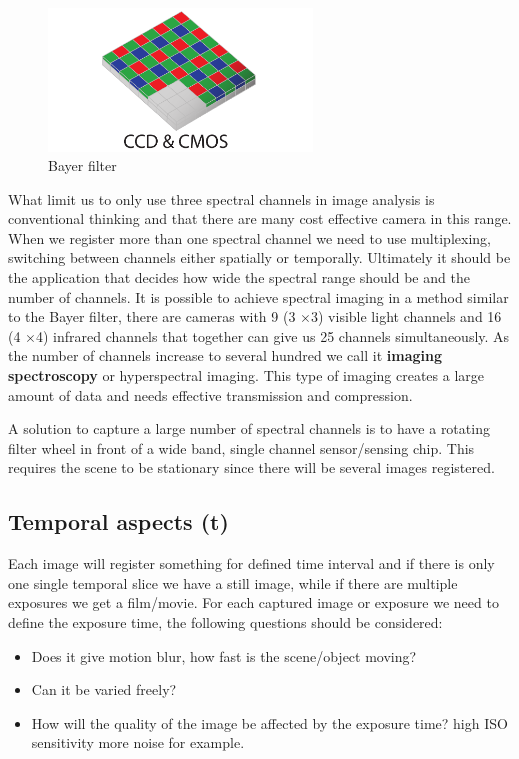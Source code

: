 \begin{figure}[ht!]
\centering
\includegraphics[width=70mm]{figures/CCDandCMOS.pdf}
\caption{Bayer filter}
\label{fig:example}
\end{figure}

What limit us to only use three spectral channels in image analysis is conventional thinking and that there are many cost effective camera in this range. When we register more than one spectral channel we need to use multiplexing, switching between channels either spatially or temporally. Ultimately it should be the application that decides how wide the spectral range should be and the number of channels. It is possible to achieve spectral imaging in a method similar to the Bayer filter, there are cameras with 9 (3 $\times$3) visible light channels and 16 (4 $\times$4) infrared channels that together can give us 25 channels simultaneously. As the number of channels increase to several hundred we call it \textbf{imaging spectroscopy} or hyperspectral imaging. This type of imaging creates a large amount of data and needs effective transmission and compression. 

A solution to capture a large number of spectral channels is to have a rotating filter wheel in front of a wide band, single channel sensor/sensing chip. This requires the scene to be stationary since there will be several images registered.

\subsection{Temporal aspects (\textbf{t})}
Each image will register something for defined time interval and if there is only one single temporal slice we have a still image, while if there are multiple exposures we get a film/movie. For each captured image or exposure we need to define the exposure time, the following questions should be considered:

\begin{itemize}
	\item Does it give motion blur, how fast is the scene/object moving?
	\item Can it be varied freely?
	\item How will the quality of the image be affected by the exposure time? high ISO sensitivity more noise for example. 
\end{itemize}

